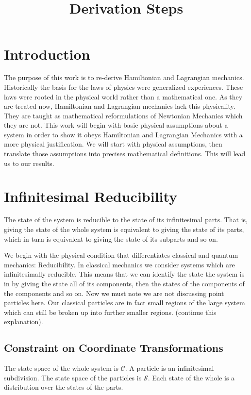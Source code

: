\documentclass{article}
\begin{document}
\title{Derivation Steps}

\section{Introduction}

	The purpose of this work is to re-derive Hamiltonian and Lagrangian mechanics. Historically the basis for the laws of physics were generalized experiences. These laws were rooted in the physical world rather than a mathematical one. As they are treated now, Hamiltonian and Lagrangian mechanics lack this physicality. They are taught as mathematical reformulations of Newtonian Mechanics which they are not. This work will begin with basic physical assumptions about a system in order to show it obeys Hamiltonian and Lagrangian Mechanics with a more physical justification. We will start with physical assumptions, then translate those assumptions into precises mathematical definitions. This will lead us to our results.

\section{Infinitesimal Reducibility}
	
\begin{assump}
	The state of the system is reducible to the state of its infinitesimal parts. That is, giving the state of the whole system is equivalent to giving the state of its parts, which in turn is equivalent to giving the state of its subparts and so on.
\end{assump}

	We begin with the physical condition that differentiates classical and quantum mechanics: Reducibility. In classical mechanics we consider systems which are infinitesimally reducible. This means that we can identify the state the system is in by giving the state all of its components, then the states of the components of the components and so on. Now we must note we are not discussing point particles here. Our classical particles are in fact small regions of the large system which can still be broken up into further smaller regions. (continue this explanation).
	
\subsection{Constraint on Coordinate Transformations}

\begin{defn}
	The state space of the whole system is $\mathcal{C}$. A particle is an infinitesimal subdivision. The state space of the particles is $\mathcal{S}$. Each state of the whole is a distribution over the states of the parts.
\end{defn}
\end{document}
